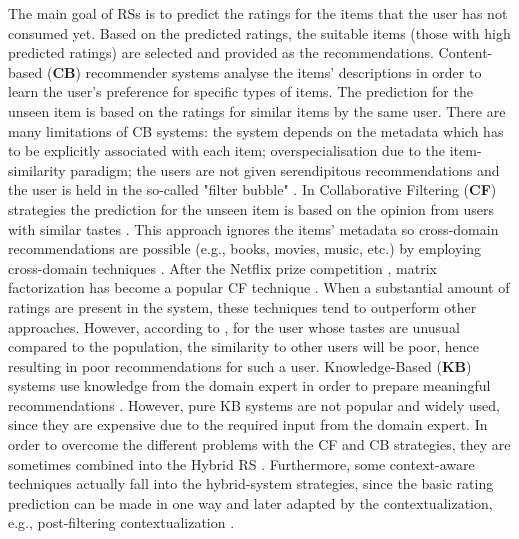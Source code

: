 \documentclass{llncs}
\begin{document}
The main goal of RSs is to predict the ratings for the items that the user has not consumed yet. Based on the predicted ratings, the suitable items (those with high predicted ratings) are selected and provided as the recommendations. Content-based (\textbf{CB}) recommender systems \cite{pazzani2007content}  analyse the items’ descriptions in order to learn the user's preference for specific types of items. The prediction for the unseen item is based on the ratings for similar items by the same user. There are many limitations of CB systems: the system depends on the metadata which has to be explicitly associated with each item; overspecialisation due to the item-similarity paradigm; the users are not given serendipitous recommendations and the user is held in the so-called "filter bubble" \cite{pariser2011filter}. In Collaborative Filtering (\textbf{CF}) strategies the prediction for the unseen item is based on the opinion from users with similar tastes \cite{resnick1994grouplens}. This approach ignores the items' metadata so cross-domain recommendations are possible (e.g., books, movies, music, etc.) by employing cross-domain techniques \cite{fernandez2012cross}. After the Netflix prize competition \cite{bennett2007netflix}, matrix factorization has become a popular CF technique \cite{Koren2008factorization,koren2009matrix}. When a substantial amount of ratings are present in the system, these techniques tend to outperform other approaches. However, according to \cite{balabanovic1997fab}, for the user whose tastes are unusual compared to the population, the similarity to other users will be poor, hence resulting in poor recommendations for such a user. Knowledge-Based (\textbf{KB}) systems use knowledge from the domain expert in order to prepare meaningful recommendations \cite{schafer1999recommender}. However, pure KB systems are not popular and widely used, since they are expensive due to the required input from the domain expert. In order to overcome the different problems with the CF and CB strategies, they are sometimes combined into the Hybrid RS \cite{burke2007hybrid}. Furthermore, some context-aware techniques actually fall into the hybrid-system strategies, since the basic rating prediction can be made in one way and later adapted by the contextualization, e.g., post-filtering contextualization \cite{Adomavicius2011}. 
\end{document}
